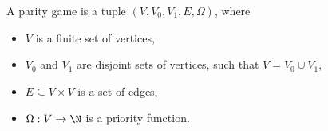 
\begin{definition}
    A parity game is a tuple $(V, V_0, V_1, E, \Omega)$, where
    \begin{itemize}
        \item $V$ is a finite set of vertices,
        \item $V_0$ and $V_1$ are disjoint sets of vertices, such that $V = V_0 \cup V_1$,
        \item $E \subseteq V \times V$ is a set of edges,
        \item $\Omega : V \to \N$ is a priority function.   
    \end{itemize}
\end{definition}